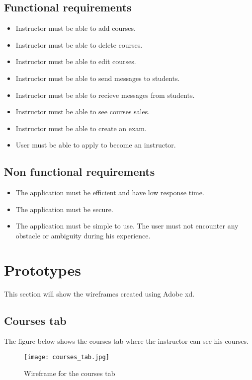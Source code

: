 \subsection{Functional requirements}
\begin{itemize}
    \item[\ding{81}] Instructor must be able to add courses.
    \item[\ding{81}] Instructor must be able to delete courses.
    \item[\ding{81}] Instructor must be able to edit courses.
    \item[\ding{81}] Instructor must be able to send messages to students.
    \item[\ding{81}] Instructor must be able to recieve messages from students.
    \item[\ding{81}] Instructor must be able to see courses sales.
    \item[\ding{81}] Instructor must be able to create an exam.
    \item[\ding{81}] User must be able to apply to become an instructor.
\end{itemize}
\subsection{Non functional requirements}
\begin{itemize}
    \item[\ding{81}] The application must be efficient and have low response time.
    \item[\ding{81}] The application must be secure.
    \item[\ding{81}] The application must be simple to use. The user must not encounter any obstacle or ambiguity during his experience.
\end{itemize}

\section{Prototypes}
This section will show the wireframes created using Adobe xd.

\subsection{Courses tab}

The figure below shows the courses tab where the instructor can see his courses.

\begin{figure}[!ht]
    \centering
    \texttt{[image: courses\_tab.jpg]}
    \caption{Wireframe for the courses tab}
    \label{fig:courses_tab}
\end{figure}


